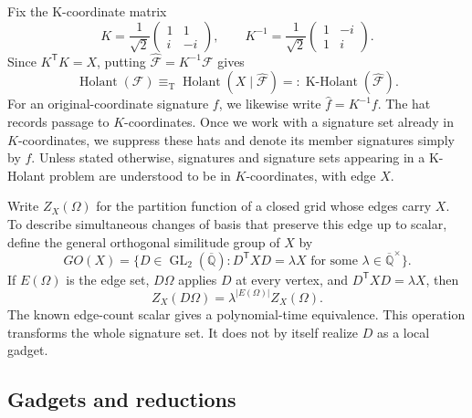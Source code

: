 \documentclass[11pt,letterpaper,onecolumn]{article}
\theoremstyle{plain}
\theoremstyle{definition}
\theoremstyle{remark}
\newcommand{\AlgNums}{\overline{\mathbb Q}}
\newcommand{\cF}{\mathcal F}
\newcommand{\Holant}{\operatorname{Holant}}
\newcommand{\KHolant}{\operatorname{K\text{-}Holant}}
\newcommand{\GL}{\operatorname{GL}}
\newcommand{\equivT}{\equiv_{\mathrm T}}
\begin{document}
Fix the K-coordinate matrix
	\begin{equation}
		K=\frac1{\sqrt2}
		\begin{pmatrix}1&1\\ i&-i\end{pmatrix},
		\qquad
		K^{-1}=\frac1{\sqrt2}
		\begin{pmatrix}1&-i\\1&i\end{pmatrix}.
		\label{eq:K-matrix}
	\end{equation}
	Since \(K^{\mathsf T}K=X\), putting
	\(\widehat{\cF}=K^{-1}\cF\) gives
	\begin{equation}
		\Holant(\cF)
		\equivT
		\Holant(X\mid\widehat{\cF})
		=:\KHolant(\widehat{\cF}).
		\label{eq:K-equivalence}
	\end{equation}
	For an original-coordinate signature \(f\), we likewise write
	\(\widehat f=K^{-1}f\). The hat records passage to \(K\)-coordinates.
	Once we work with a signature set already in \(K\)-coordinates, we suppress
	these hats and denote its member signatures simply by \(f\).  Unless stated
	otherwise, signatures and signature sets appearing in a K-Holant problem
	are understood to be in \(K\)-coordinates, with edge \(X\).

Write \(Z_X(\Omega)\) for the partition function of a closed grid
	whose edges carry \(X\).  To describe simultaneous changes of basis
	that preserve this edge up to scalar, define the general orthogonal
	similitude group of \(X\) by
	\begin{equation*}
		GO(X)
		=
		\{D\in\GL_2(\AlgNums):D^{\mathsf T}XD=\lambda X
		\text{ for some }\lambda\in\AlgNums^\times\}.
	\end{equation*}
	If \(E(\Omega)\) is the edge set,
	\(D\Omega\) applies \(D\) at every vertex, and
	\(D^{\mathsf T}XD=\lambda X\), then
	\begin{equation}
		Z_X(D\Omega)=\lambda^{|E(\Omega)|}Z_X(\Omega).
		\label{eq:GOX-global-scalar}
	\end{equation}
	The known edge-count scalar gives a polynomial-time equivalence.  This
	operation transforms the whole signature set. It does not by itself
	realize \(D\) as a local gadget.

\subsection{Gadgets and reductions}
\label{subsec:gadget-proof-vocabulary}
\label{subsec:reduction-conventions}
\end{document}
